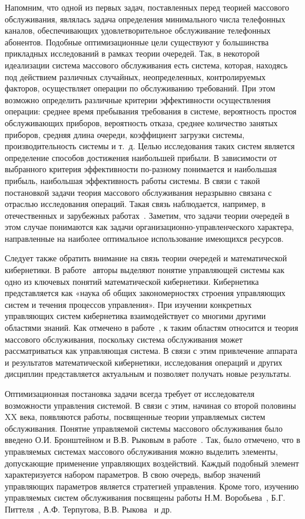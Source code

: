 Напомним, что одной из первых задач, поставленных перед теорией массового обслуживания, являлась задача определения минимального числа телефонных каналов, обеспечивающих удовлетворительное обслуживание телефонных абонентов. Подобные оптимизационные цели существуют у большинства прикладных исследований в рамках теории очередей. Так, в некоторой идеализации система массового обслуживания есть система, которая, находясь под действием различных случайных, неопределенных, контролируемых факторов, осуществляет операции по обслуживанию требований. При этом возможно определить различные критерии эффективности осуществления операции: среднее время пребывания требования в системе, вероятность простоя обслуживающих приборов, вероятность отказа, среднее количество занятых приборов, средняя длина очереди, коэффициент загрузки системы, производительность системы и т.~д. Целью исследования таких систем является определение способов достижения наибольшей прибыли. В зависимости от выбранного критерия эффективности по-разному понимается и наибольшая прибыль, наибольшая эффективность работы системы. В связи с такой постановкой задачи теория массового обслуживания неразрывно связана с отраслью исследования операций. Такая связь наблюдается, например, в отечественных и зарубежных работах~\cite{Buslenko1968,Bailey1957,Flagle1962}. Заметим, что задачи теории очередей в этом случае понимаются как задачи организационно-управленческого  характера, направленные на наиболее оптимальное использование имеющихся ресурсов. 

Следует также обратить внимание на связь теории очередей и математической кибернетики. В работе~\cite{Lyapunov} авторы выделяют понятие управляющей системы как одно из ключевых понятий математической кибернетики. Кибернетика представляется как «наука об общих закономерностях строения управляющих систем и течения процессов управления». При изучении конкретных управляющих систем кибернетика взаимодействует со многими другими областями знаний. Как отмечено в работе~\cite{Lyapunov}, к таким областям относится и теория массового обслуживания, поскольку система обслуживания может рассматриваться как управляющая система. В связи с этим привлечение аппарата и результатов математической кибернетики, исследования операций и других дисциплин представляется актуальным и позволяет получать новые результаты.

Оптимизационная постановка задачи всегда требует от исследователя возможности управления системой. В связи с этим, начиная со второй половины XX века, появляются работы, посвященные теории управляемых систем обслуживания. Понятие управляемой системы массового обслуживания было введено О.И. Бронштейном и В.В. Рыковым в работе~\cite{BronshteinRykov}. Так, было отмечено, что в управляемых системах массового обслуживания можно выделить элементы, допускающие применение управляющих воздействий.  Каждый подобный элемент характеризуется набором параметров. В свою очередь, выбор значений управляющих параметров является стратегией управления. Кроме того, изучению управляемых систем обслуживания посвящены работы Н.М. Воробьева~\cite{Vorobiev1967}, Б.Г. Питтеля~\cite{Pittel1972}, А.Ф. Терпугова, В.В. Рыкова~\cite{Rykov1975} и др.

